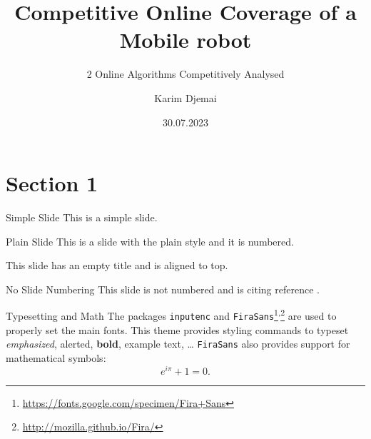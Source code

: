 \documentclass{beamer}
\title{Competitive Online Coverage of a Mobile robot}
\subtitle{2 Online Algorithms Competitively Analysed}
\author{Karim Djemai}
\institute{Universität Hamburg}
\date{30.07.2023}
\begin{document}

\begin{frame}
    \maketitle %
\end{frame}


\section{Section 1} %


\begin{frame}{Simple Slide}
    This is a simple slide.
\end{frame}


\begin{frame}[plain]{Plain Slide}
    This is a slide with the plain style and it is numbered.
\end{frame}


\begin{frame}[t]
    This slide has an empty title and is aligned to top.
\end{frame}


\begin{frame}[noframenumbering]{No Slide Numbering}
    This slide is not numbered and is citing reference \cite{knuth74}.
\end{frame}


\begin{frame}{Typesetting and Math}
    The packages \texttt{inputenc} and \texttt{FiraSans}\footnote{\url{https://fonts.google.com/specimen/Fira+Sans}}\textsuperscript{,}\footnote{\url{http://mozilla.github.io/Fira/}} are used to properly set the main fonts.
    \vfill
    This theme provides styling commands to typeset \emph{emphasized}, \alert{alerted}, \textbf{bold}, \textcolor{example}{example text}, \dots
    \vfill
    \texttt{FiraSans} also provides support for mathematical symbols:
    \begin{equation*}
        e^{i\pi} + 1 = 0.
    \end{equation*}
\end{frame}
\end{document}
